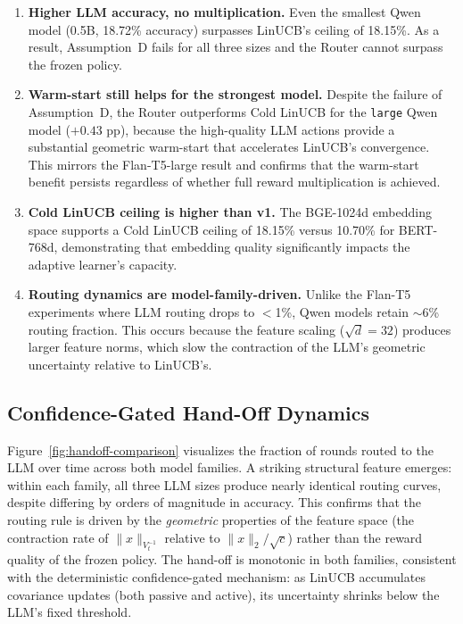 \begin{enumerate}[nosep]
\item \textbf{Higher LLM accuracy, no multiplication.} Even the smallest Qwen model (0.5B, 18.72\% accuracy) surpasses LinUCB's ceiling of 18.15\%. As a result, Assumption~D fails for all three sizes and the Router cannot surpass the frozen policy.

\item \textbf{Warm-start still helps for the strongest model.} Despite the failure of Assumption~D, the Router outperforms Cold LinUCB for the \texttt{large} Qwen model ($+0.43$ pp), because the high-quality LLM actions provide a substantial geometric warm-start that accelerates LinUCB's convergence. This mirrors the Flan-T5-large result and confirms that the warm-start benefit persists regardless of whether full reward multiplication is achieved.

\item \textbf{Cold LinUCB ceiling is higher than v1.} The BGE-1024d embedding space supports a Cold LinUCB ceiling of 18.15\% versus 10.70\% for BERT-768d, demonstrating that embedding quality significantly impacts the adaptive learner's capacity.

\item \textbf{Routing dynamics are model-family-driven.} Unlike the Flan-T5 experiments where LLM routing drops to $<$1\%, Qwen models retain $\sim$6\% routing fraction. This occurs because the feature scaling ($\sqrt{d}=32$) produces larger feature norms, which slow the contraction of the LLM's geometric uncertainty relative to LinUCB's.
\end{enumerate}

\subsection{Confidence-Gated Hand-Off Dynamics}
\label{sec:handoff}

Figure~\ref{fig:handoff-comparison} visualizes the fraction of rounds routed to the LLM over time across both model families. A striking structural feature emerges: within each family, all three LLM sizes produce nearly identical routing curves, despite differing by orders of magnitude in accuracy. This confirms that the routing rule is driven by the \emph{geometric} properties of the feature space (the contraction rate of $\|x\|_{V_t^{-1}}$ relative to $\|x\|_2/\sqrt{c}$) rather than the reward quality of the frozen policy. The hand-off is monotonic in both families, consistent with the deterministic confidence-gated mechanism: as LinUCB accumulates covariance updates (both passive and active), its uncertainty shrinks below the LLM's fixed threshold.

